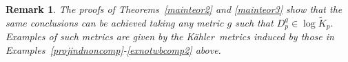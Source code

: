 \documentclass[12pt]{amsart}
\newcommand{\K}{K\"{a}hler}
\newtheorem{remark}{Remark}
\begin{document}
\begin{remark}\rm\label{RmkAlsoOtherMetrics}
	The proofs of Theorems~\ref{mainteor2} and \ref{mainteor3} show that the same conclusions can be achieved taking any metric $g$ such that $D_p^g\in \log\tilde K_p$.
	Examples of such metrics are given by the  \K\ metrics induced by those in Examples~\ref{projindnoncomp}-\ref{exnotwbcomp2} above.
\end{remark}



	

\end{document}
